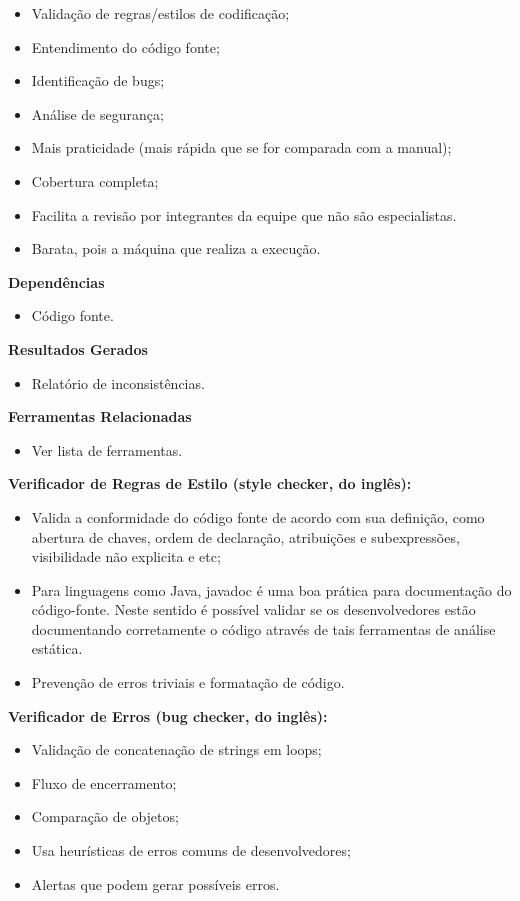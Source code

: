 \begin{itemize}
    \item Validação de regras/estilos de codificação;
    \item Entendimento do código fonte;
    \item Identificação de bugs;
    \item Análise de segurança;
    \item Mais praticidade (mais rápida que se for comparada com a manual);
    \item Cobertura completa;
    \item Facilita a revisão por integrantes da equipe que não são especialistas.
    \item Barata, pois a máquina que realiza a execução.
\end{itemize}

\textbf{ Dependências }
\begin{itemize}
    \item Código fonte.
\end{itemize}

\textbf{ Resultados Gerados }
\begin{itemize}
    \item Relatório de inconsistências.
\end{itemize}

\textbf{ Ferramentas Relacionadas }
\begin{itemize}
    \item Ver lista de ferramentas.
\end{itemize}

\textbf{ Verificador de Regras de Estilo (style checker, do inglês): }
\begin{itemize}
    \item Valida a conformidade do código fonte de acordo com sua definição, como abertura de chaves, ordem de declaração, atribuições e subexpressões, visibilidade não explicita e etc;
    \item Para linguagens como Java, javadoc é uma boa prática para documentação do código-fonte. Neste sentido é possível validar se os desenvolvedores estão documentando corretamente o código através de tais ferramentas de análise estática.
    \item Prevenção de erros triviais e formatação de código.
\end{itemize}

\textbf{Verificador de Erros (bug checker, do inglês):}

\begin{itemize}
    \item Validação de concatenação de strings em loops;
    \item Fluxo de encerramento;
    \item Comparação de objetos;
    \item Usa heurísticas de erros comuns de desenvolvedores;
    \item Alertas que podem gerar possíveis erros.
\end{itemize}

